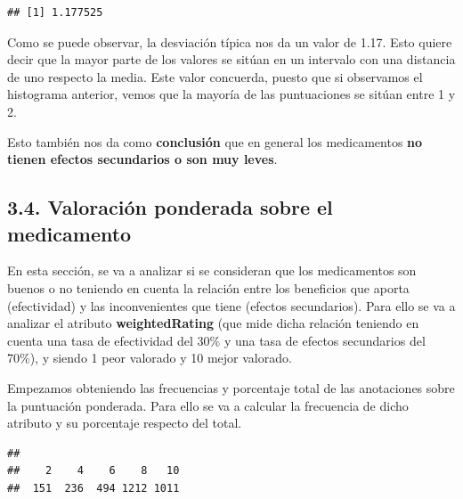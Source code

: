 \documentclass[spanish,]{article}
\newenvironment{Shaded}{\begin{snugshade}}{\end{snugshade}}
\newcommand{\KeywordTok}[1]{\textcolor[rgb]{0.13,0.29,0.53}{\textbf{#1}}}
\newcommand{\DecValTok}[1]{\textcolor[rgb]{0.00,0.00,0.81}{#1}}
\newcommand{\StringTok}[1]{\textcolor[rgb]{0.31,0.60,0.02}{#1}}
\newcommand{\CommentTok}[1]{\textcolor[rgb]{0.56,0.35,0.01}{\textit{#1}}}
\newcommand{\OperatorTok}[1]{\textcolor[rgb]{0.81,0.36,0.00}{\textbf{#1}}}
\newcommand{\NormalTok}[1]{#1}
\begin{document}
\begin{verbatim}
## [1] 1.177525
\end{verbatim}

Como se puede observar, la desviación típica nos da un valor de 1.17.
Esto quiere decir que la mayor parte de los valores se sitúan en un
intervalo con una distancia de uno respecto la media. Este valor
concuerda, puesto que si observamos el histograma anterior, vemos que la
mayoría de las puntuaciones se sitúan entre 1 y 2.

Esto también nos da como \textbf{conclusión} que en general los
medicamentos \textbf{no tienen efectos secundarios o son muy leves}.

\subsection{3.4. Valoración ponderada sobre el
medicamento}\label{valoracion-ponderada-sobre-el-medicamento}

En esta sección, se va a analizar si se consideran que los medicamentos
son buenos o no teniendo en cuenta la relación entre los beneficios que
aporta (efectividad) y las inconvenientes que tiene (efectos
secundarios). Para ello se va a analizar el atributo
\textbf{weightedRating} (que mide dicha relación teniendo en cuenta una
tasa de efectividad del 30\% y una tasa de efectos secundarios del
70\%), y siendo 1 peor valorado y 10 mejor valorado.

Empezamos obteniendo las frecuencias y porcentaje total de las
anotaciones sobre la puntuación ponderada. Para ello se va a calcular la
frecuencia de dicho atributo y su porcentaje respecto del total.

\begin{Shaded}
\end{Shaded}

\begin{verbatim}
## 
##    2    4    6    8   10 
##  151  236  494 1212 1011
\end{verbatim}

\begin{Shaded}
\end{Shaded}
\end{document}
